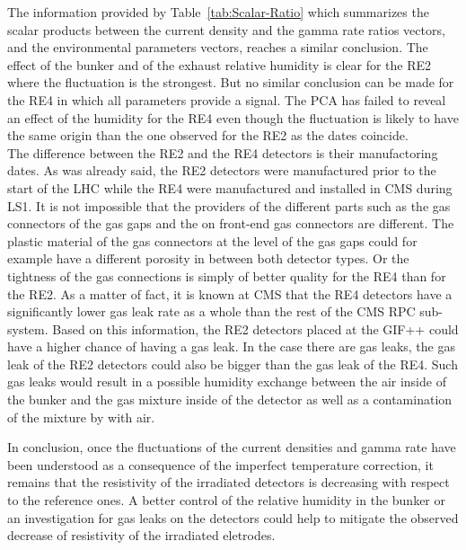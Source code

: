 	The information provided by Table~\ref{tab:Scalar-Ratio} which summarizes the scalar products between the current density and the gamma rate ratios vectors, and the environmental parameters vectors, reaches a similar conclusion. The effect of the bunker and of the exhaust relative humidity is clear for the RE2 where the fluctuation is the strongest. But no similar conclusion can be made for the RE4 in which all parameters provide a signal. The PCA has failed to reveal an effect of the humidity for the RE4 even though the fluctuation is likely to have the same origin than the one observed for the RE2 as the dates coincide.\\
	The difference between the RE2 and the RE4 detectors is their manufactoring dates. As was already said, the RE2 detectors were manufactured prior to the start of the LHC while the RE4 were manufactured and installed in CMS during LS1. It is not impossible that the providers of the different parts such as the gas connectors of the gas gaps and the on front-end gas connectors are different. The plastic material of the gas connectors at the level of the gas gaps could for example have a different porosity in between both detector types. Or the tightness of the gas connections is simply of better quality for the RE4 than for the RE2. As a matter of fact, it is known at CMS that the RE4 detectors have a significantly lower gas leak rate as a whole than the rest of the CMS RPC sub-system. Based on this information, the RE2 detectors placed at the GIF++ could have a higher chance of having a gas leak. In the case there are gas leaks, the gas leak of the RE2 detectors could also be bigger than the gas leak of the RE4. Such gas leaks would result in a possible humidity exchange between the air inside of the bunker and the gas mixture inside of the detector as well as a contamination of the mixture by with air.

\endgroup
	
	In conclusion, once the fluctuations of the current densities and gamma rate have been understood as a consequence of the imperfect temperature correction, it remains that the resistivity of the irradiated detectors is decreasing with respect to the reference ones. A better control of the relative humidity in the bunker or an investigation for gas leaks on the detectors could help to mitigate the observed decrease of resistivity of the irradiated eletrodes.
	
